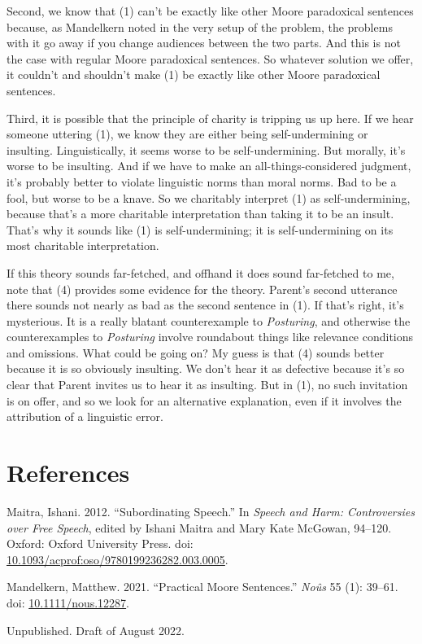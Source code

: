 \documentclass[
  10pt,
  letterpaper,
  DIV=11,
  numbers=noendperiod,
  twoside]{scrartcl}
\newlength{\cslhangindent}
\newenvironment{CSLReferences}[2] %
 {\begin{list}{}{%
  \setlength{\itemindent}{0pt}
  \setlength{\leftmargin}{0pt}
  \setlength{\parsep}{0pt}
  \ifodd #1
   \setlength{\leftmargin}{\cslhangindent}
   \setlength{\itemindent}{-1\cslhangindent}
  \fi
  \setlength{\itemsep}{#2\baselineskip}}}
 {\end{list}}
\begin{document}
Second, we know that (1) can't be exactly like other Moore paradoxical
sentences because, as Mandelkern noted in the very setup of the problem,
the problems with it go away if you change audiences between the two
parts. And this is not the case with regular Moore paradoxical
sentences. So whatever solution we offer, it couldn't and shouldn't make
(1) be exactly like other Moore paradoxical sentences.

Third, it is possible that the principle of charity is tripping us up
here. If we hear someone uttering (1), we know they are either being
self-undermining or insulting. Linguistically, it seems worse to be
self-undermining. But morally, it's worse to be insulting. And if we
have to make an all-things-considered judgment, it's probably better to
violate linguistic norms than moral norms. Bad to be a fool, but worse
to be a knave. So we charitably interpret (1) as self-undermining,
because that's a more charitable interpretation than taking it to be an
insult. That's why it sounds like (1) is self-undermining; it is
self-undermining on its most charitable interpretation.

If this theory sounds far-fetched, and offhand it does sound far-fetched
to me, note that (4) provides some evidence for the theory. Parent's
second utterance there sounds not nearly as bad as the second sentence
in (1). If that's right, it's mysterious. It is a really blatant
counterexample to \emph{Posturing}, and otherwise the counterexamples to
\emph{Posturing} involve roundabout things like relevance conditions and
omissions. What could be going on? My guess is that (4) sounds better
because it is so obviously insulting. We don't hear it as defective
because it's so clear that Parent invites us to hear it as insulting.
But in (1), no such invitation is on offer, and so we look for an
alternative explanation, even if it involves the attribution of a
linguistic error.

\section*{References}\label{references}

\label{refs}
\begin{CSLReferences}{1}{0}
Maitra, Ishani. 2012. {``Subordinating Speech.''} In \emph{Speech and
Harm: Controversies over Free Speech}, edited by Ishani Maitra and Mary
Kate McGowan, 94--120. Oxford: Oxford University Press. doi:
\href{https://doi.org/10.1093/acprof:oso/9780199236282.003.0005}{10.1093/acprof:oso/9780199236282.003.0005}.

Mandelkern, Matthew. 2021. {``Practical Moore Sentences.''}
\emph{No{û}s} 55 (1): 39--61. doi:
\href{https://doi.org/10.1111/nous.12287}{10.1111/nous.12287}.

\end{CSLReferences}



\noindent Unpublished. Draft of August 2022.
\end{document}
